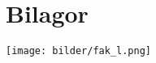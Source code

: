\section{Bilagor}
\begin{center}
    \texttt{[image: bilder/fak\_l.png]}
    \label{fig:fak_l}
\end{center}
